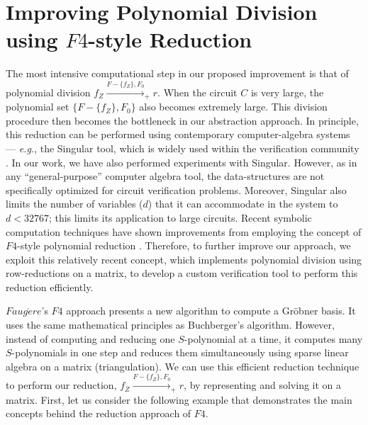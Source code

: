 
\section{Improving Polynomial Division using $F4$-style Reduction}

The most intensive computational step in our proposed improvement 
is that of polynomial division $f_Z \xrightarrow{F-\{f_Z\},F_0}_+ r$. 
When the circuit $C$ is very large, the polynomial set
$\{F-\{f_Z\},F_0\}$ also becomes extremely large. This division
procedure then becomes the bottleneck in our abstraction approach.  
In principle, this reduction can be performed using contemporary
computer-algebra systems --- {\it e.g.},  the {\sc Singular}
\cite{DGPS} tool, which is widely used within the verification
community \cite{wienand:cav08} \cite{wedler:date11}
\cite{lv:date2012}. In our work, we have also performed experiments 
with {\sc Singular}. However, as in any ``general-purpose''
computer algebra tool, the data-structures are not specifically
optimized for circuit verification problems. Moreover, {\sc
  Singular} also limits the number of variables ($d$) that it can
accommodate in the system to $d < 32767$; this limits its
application to large circuits. Recent symbolic computation techniques \cite{lv:phd}
have shown improvements from employing the concept of $F4$-style 
polynomial reduction \cite{f4}.
Therefore, to further improve our
approach, we exploit this relatively recent concept, 
which implements polynomial division
using row-reductions on a matrix, to develop a custom
verification tool to perform this reduction
efficiently.

$Faug\grave{e}re$'s $F4$ approach \cite{f4} presents a new algorithm to
compute a Gr\"obner basis. It uses the same mathematical principles as
Buchberger's algorithm. However, instead of computing and reducing one 
$S$-polynomial at a time, it computes many $S$-polynomials in one
step and reduces them simultaneously using sparse linear algebra on a
matrix (triangulation). We can use this efficient reduction technique
to perform our reduction, $f_Z \xrightarrow{F-\{f_Z\},F_0}_+ r$, by 
representing and solving it on a matrix.
First, let us consider the following example that demonstrates the
main concepts behind the reduction approach of $F4$. 

